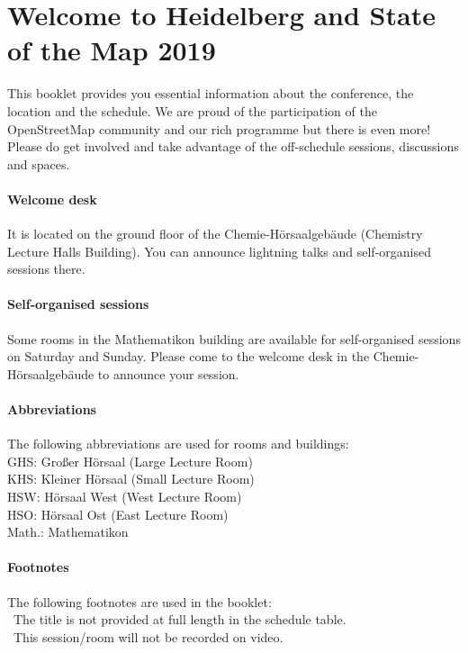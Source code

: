 \newpage
\enlargethispage{1\baselineskip}
\section*{Welcome to Heidelberg and State of the Map 2019} \label{welcome}
This booklet provides you essential information
about the conference, the location and the schedule.  We are proud of the participation of the
OpenStreetMap community and our rich programme but there is even more!  Please do get involved and
take advantage of the off-schedule sessions, discussions and spaces.

\paragraph*{Welcome desk} \label{welcome-helpdesk}
It is located on the ground floor of the Chemie-Hörsaal\-gebäude (Chemistry
Lecture Halls Building). You can announce lightning talks and self-organised sessions there.

\paragraph*{Self-organised sessions} \label{welcome-location}
Some rooms in the Mathematikon building are available for self-organised sessions on Saturday and
Sunday. Please come to the welcome desk in the Chemie-Hörsaalgebäude to announce your session.

\paragraph*{Abbreviations}
The following abbreviations are used for rooms and buildings:\\
GHS: Großer Hörsaal (Large Lecture Room)\\
KHS: Kleiner Hörsaal (Small Lecture Room)\\
HSW: Hörsaal West (West Lecture Room)\\
HSO: Hörsaal Ost (East Lecture Room)\\
Math.: Mathematikon


\paragraph*{Footnotes}
The following footnotes are used in the booklet:\\
\diamondSymbol\ The title is not provided at full length in the schedule table.\\
\noVideo\ This session/room will not be recorded on video.

\newpage
